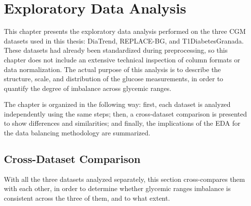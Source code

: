 
\chapter{Exploratory Data Analysis}
\label{chap:eda}

This chapter presents the exploratory data analysis performed on the three CGM datasets used in this thesis: DiaTrend, REPLACE-BG, and T1DiabetesGranada. These datasets had already been standardized during preprocessing, so this chapter does not include an extensive technical inspection of column formats or data normalization. The actual purpose of this analysis is to describe the structure, scale, and distribution of the glucose measurements, in order to quantify the degree of imbalance across glycemic ranges.

The chapter is organized in the following way: first, each dataset is analyzed independently using the same steps; then, a cross-dataset comparison is presented to show differences and similarities; and finally, the implications of the EDA for the data balancing methodology are summarized.





\section{Cross-Dataset Comparison}
\label{sec:eda_cross_dataset_comparison}
With all the three datasets analyzed separately, this section cross-compares them with each other, in order to determine whether glycemic ranges imbalance is consistent across the three of them, and to what extent.

